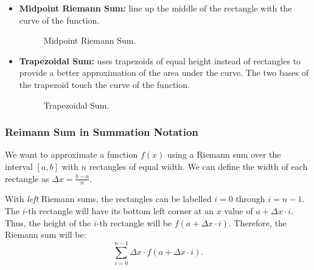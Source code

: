 \documentclass[12pt]{article}
\begin{document}
\begin{itemize}
	\item \textbf{Midpoint Riemann Sum:} line up the middle of the rectangle with the curve of the function.
	\begin{figure}[H]
		\centering
		\caption{Midpoint Riemann Sum.}
	\end{figure}

	\item \textbf{Trapezoidal Sum:} uses trapezoids of equal height instead of rectangles to provide a better approximation of the area under the curve. The two bases of the trapezoid touch the curve of the function.
	\begin{figure}[H]
		\centering
		\caption{Trapezoidal Sum.}
	\end{figure}
\end{itemize}

\subsubsection{Reimann Sum in Summation Notation}
We want to approximate a function $f(x)$ using a Riemann sum over the interval $[a, b]$ with $n$ rectangles of equal width. We can define the width of each rectangle as ${\Delta x = \frac{b - a}{n}}$.

With \textit{left} Riemann sums, the rectangles can be labelled $i = 0$ through $i = n - 1$. The $i$-th rectangle will have its bottom left corner at an $x$ value of $a + \Delta x \cdot i$. Thus, the height of the $i$-th rectangle will be $f(a + \Delta x \cdot i)$. Therefore, the Riemann sum will be:
\[ \sum_{i = 0}^{n - 1} \Delta x \cdot f(a + \Delta x \cdot i). \]
\end{document}
